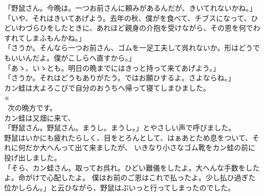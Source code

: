 \documentclass[
a4paper,
10pt,
book]
{tarticle}
\begin{document}
\newpage
\setcounter{page}{6}
\thispagestyle{fancy}
「野鼠さん。今晩は。一つお前さんに頼みがあるんだが、きいてれないかね。」\\
「いや、それはきいてあげよう。去年の秋、僕がを食べて、チブスになって、ひどいわづらひをしたときに、あれほど親身の介抱を受けながら、その恩を何でわすれてしまふもんかね。」\\
「さうか。そんなら一つお前さん、ゴムを一足工夫して呉れないか。形はどうでもいいんだよ。僕がこしらへ直すから。」\\
「あゝ、いゝとも。明日の晩までにはきっと持って来てあげよう。」\\
「さうか。それはどうもありがたう。ではお願ひするよ。さよならね。」\\
\indent カン蛙は大よろこびで自分のおうちへ帰って寝てしまひました。\\
\indent \indent \indent \indent \indent \indent \indent \indent \indent \indent ※\\
\, 次の晩方です。\\
\indent カン蛙は又畑に来て、\\
「野鼠さん。野鼠さん。まうし。まうし。」とやさしい声で呼びました。\\
\indent 野鼠はいかにも疲れたらしく、目をとろんとして、はぁあとため息をついて、それに何だか大へんって出て来ましたが、
いきなり小さなゴム靴をカン蛙の前に投げ出しました。\\
「そら、カン蛙さん。取ってお呉れ。ひどい難儀をしたよ。大へんな手数をしたよ。命がけで心配したよ。
僕はお前のご恩はこれで払ったよ。少し払ひ過ぎた位かしらん。」と云ひながら、野鼠はぷいっと行ってしまったのでした。
\end{document}
